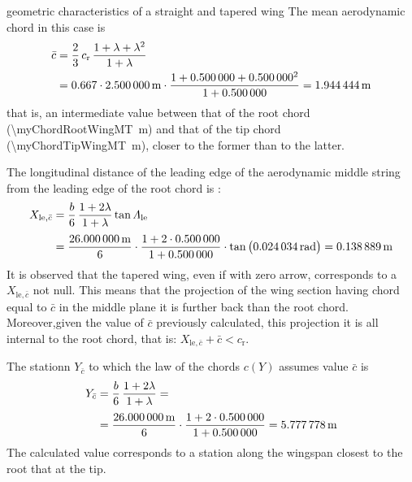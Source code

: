 \documentclass[[12pt,twoside]{book}
\begin{document}
\begin{myExampleX}{geometric characteristics of a straight and tapered wing}{}
The mean aerodynamic chord in this case is
\[
\begin{split}
\bar{c} & {}= \frac{2}{3} \, c_\mathrm{r} \, \frac{1+\lambda + \lambda^2}{1+\lambda} \\
  & {}=
    \num{0.667} \cdot \SI[round-precision=2]{\myChordRootWingMT}{\metre}
      \cdot 
        \frac{
          1 + \SI[round-precision=2]{\myTaperRatioWing}{} + \SI[round-precision=2]{\myTaperRatioWing}{}^2
        }{
          1 + \SI[round-precision=2]{\myTaperRatioWing}{}
        }
    =  \SI[round-precision=2]{\myMACWingMT}{\metre} 
\end{split}
\]
that is, an intermediate value between that of the root chord (\SI[round-precision=2]{\myChordRootWingMT}{\metre}) 
and that of the tip chord (\SI[round-precision=2]{\myChordTipWingMT}{\metre}),
closer to the former than to the latter.

The longitudinal distance of the leading edge of the aerodynamic middle string from the
leading edge of the root chord is :
\[
\begin{split}
X_{\mathrm{le},\bar{c}} 
  & {}=
    \frac{b}{6} \, \frac{1+2\lambda}{1+\lambda} \tan\Lambda_\mathrm{le} \\[3pt]
  & {}=
    \frac{\SI[round-precision=1]{\mySpanWingMT}{\metre}}{6}
      \cdot 
      \frac{
        1 + 2\cdot\SI[round-precision=2]{\myTaperRatioWing}{}
      }{
        1 + \SI[round-precision=2]{\myTaperRatioWing}{}
      }
      \cdot \tan \big( \SI[round-precision=3]{\myLambdaLERad}{\radian} \big)
    =  \SI[round-precision=2]{\myXLEMACWingMT}{\metre} %
\end{split}
\]
It is observed that the tapered wing, even if with zero arrow, corresponds to a
$X_{\mathrm{le},\bar{c}}$ not null. This means that the projection of the wing section having
chord equal to $\bar{c}$ in the middle plane it is further back than the root chord.
Moreover,given the value of $\bar{c}$ previously calculated, this projection
it is all internal to the root chord, that is:
$X_{\mathrm{le},\bar{c}}+\bar{c}<c_\mathrm{r}$.


The  stationn $Y_{\bar{c}}$ to which the law of the chords $c(Y)$ assumes value $\bar{c}$ is
\[
\begin{split}
Y_{\bar{c}} 
  & {}=
    \frac{b}{6} \, \frac{1+2\lambda}{1+\lambda} = \\[3pt]
  & {}=
    \frac{\SI[round-precision=1]{\mySpanWingMT}{\metre}}{6}
      \cdot 
      \frac{
        1 + 2\cdot\SI[round-precision=2]{\myTaperRatioWing}{}
      }{
        1 + \SI[round-precision=2]{\myTaperRatioWing}{}
      }
    =  \SI[round-precision=2]{\myYMACWingMT}{\metre} 
\end{split}
\]
The calculated value corresponds to a station along the wingspan closest to the root that
at the tip.

\end{myExampleX}
\end{document}
